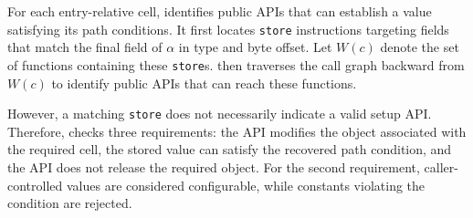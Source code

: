 



For each entry-relative cell,
\sys identifies public APIs that can establish a value satisfying its path conditions. It first locates \texttt{store} instructions targeting fields that match the final field of $\alpha$ in type and byte offset. Let $W(c)$ denote the set of functions containing these \texttt{store}s. \sys then traverses the call graph backward from $W(c)$ to identify public APIs that can reach these functions.

However, a matching \texttt{store} does not necessarily indicate a valid setup API. Therefore, \sys checks three requirements:  the API modifies the object associated with the required cell,  the stored value can satisfy the recovered path condition, and  the API does not release the required object. For the second requirement, caller-controlled values are considered configurable, while constants violating the condition are rejected.

